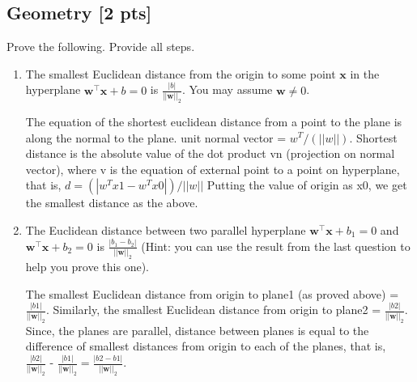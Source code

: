\documentclass[a4paper]{article}
\theoremstyle{definition}
\newenvironment{soln}{
    \leavevmode\color{blue}\ignorespaces
}{}
\begin{document}
\subsection{Geometry [2 pts]}
Prove the following.  Provide all steps.
\begin{enumerate}
\item 	The smallest Euclidean distance from the origin to some point $\mathbf{x}$ in the hyperplane $\mathbf{w}^\top\mathbf{x} + b = 0$ is $\frac{|b|}{||\mathbf{w}||_2}$.  You may assume $\mathbf{w} \neq 0$.\\
\begin{soln}  
		
		The equation of the shortest euclidean distance from a point to the plane is along the normal to the plane. unit normal vector = $w^{T}/(||w||)$. Shortest distance is the absolute value of the dot product vn (projection on normal vector), where v is the equation of external point to a point on hyperplane, that is,
		$d  = 	(|w^{T}x1 - w^{T}x0|)/||w||  $	
		Putting the value of origin as x0, we get the smallest distance as the above.
 \end{soln}

\item 	The Euclidean distance between two parallel hyperplane $\mathbf{w}^\top\mathbf{x} + b_1 = 0$ and $\mathbf{w}^\top\mathbf{x} + b_2 = 0$ is $\frac{|b_1 - b_2|}{||\mathbf{w}||_2}$ (Hint: you can use the result from the last question to help you prove this one).

\begin{soln}  
		The smallest Euclidean distance from origin to plane1 (as proved above) =  $\frac{|b1|}{||\mathbf{w}||_2}$. Similarly, the smallest Euclidean distance from origin to plane2 =  $\frac{|b2|}{||\mathbf{w}||_2}$.
		Since, the planes are parallel, distance between planes is equal to the difference of smallest distances from origin to each of the planes, that is,   
		\\$\frac{|b2|}{||\mathbf{w}||_2}$ - $\frac{|b1|}{||\mathbf{w}||_2} = \frac{|b2 - b1|}{||\mathbf{w}||_2}.$ 
 \end{soln}

\end{enumerate}
\end{document}
